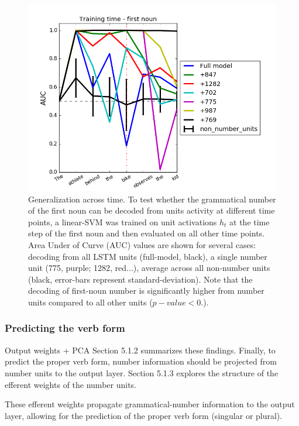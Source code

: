 \lipsum[1]

\begin{figure}
\centering
\includegraphics[width=\linewidth]{Figures/Figure3_number_units_GAT.png}
\caption{Generalization across time. To test whether the grammatical number of the first noun can be decoded from units activity at different time points, a linear-SVM was trained on unit activations $h_t$ at the time step of the first noun and then evaluated on all other time points. Area Under of Curve (AUC) values are shown for several cases: decoding from all LSTM units (full-model, black), a single number unit (775, purple; 1282, red...), average across all non-number units (black, error-bars represent standard-deviation). Note that the decoding of first-noun number is significantly higher from number units compared to all other units ($p-value<0.$).}
\end{figure}

\lipsum[1]

\subsubsection{Predicting the verb form}
Output weights + PCA
Section 5.1.2 summarizes these findings. Finally, to predict the proper verb form, number information should be projected from number units to the output layer. Section 5.1.3 explores the structure of the efferent weights of the number units. 

These efferent weights propagate grammatical-number information to the output layer, allowing for the prediction of the proper verb form (singular or plural). 

